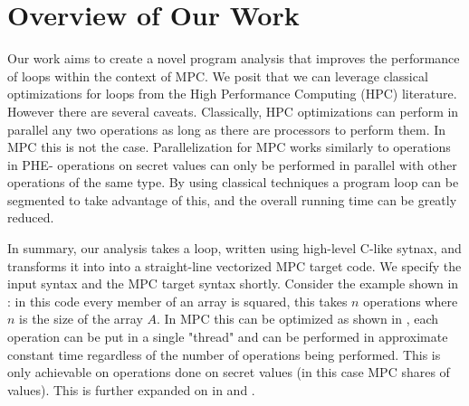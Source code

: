 

% 

% 



\section{Overview of Our Work}
\label{sec:mpcoverview}

Our work aims to create a novel program analysis that improves the performance of loops within the 
context of MPC. We posit that we can leverage classical optimizations for loops from the 
High Performance Computing (HPC) literature. 
However there are several caveats. 
Classically, HPC optimizations can perform in parallel any two operations as long as there are processors to perform them. In 
MPC this is not the case. Parallelization for MPC works similarly to operations in PHE- operations 
on secret values can only be performed in parallel with other operations of the same type. 
By using classical techniques a program loop can be segmented to take advantage of this, 
and the overall running time can be greatly reduced. 

In summary, our analysis takes a loop, written using high-level C-like sytnax, and transforms it into 
into a straight-line vectorized MPC target code. We specify the input syntax and the MPC target syntax shortly.
Consider the example shown in : in this
code every member of an array is squared, this takes $n$ operations where $n$ is the size of the array $A$.
In MPC  this can be optimized as shown in , each operation can be put in a single
"thread" and can be performed in approximate constant 
time regardless of the number of operations being performed. This is only achievable on operations done
on secret values (in this case MPC shares of values). This is further expanded on in 
 and .

